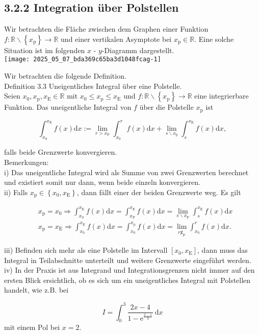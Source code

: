 \documentclass[10pt]{article}
\begin{document}
\subsection*{3.2.2 Integration über Polstellen}
Wir betrachten die Fläche zwischen dem Graphen einer Funktion $f: \mathbb{R} \backslash\left\{x_{\mathrm{p}}\right\} \rightarrow \mathbb{R}$ und einer vertikalen Asymptote bei $x_{\mathrm{p}} \in \mathbb{R}$. Eine solche Situation ist im folgenden $x$ - $y$-Diagramm dargestellt.\\
\texttt{[image: 2025\_05\_07\_bda369c65ba3d1048fcag-1]}

Wir betrachten die folgende Definition.\\
Definition 3.3 Uneigentliches Integral über eine Polstelle.\\
Seien $x_{0}, x_{\mathrm{p}}, x_{\mathrm{E}} \in \mathbb{R}$ mit $x_{0} \leq x_{\mathrm{p}} \leq x_{\mathrm{E}}$ und $f: \mathbb{R} \backslash\left\{x_{\mathrm{p}}\right\} \rightarrow \mathbb{R}$ eine integrierbare Funktion. Das uneigentliche Integral von $f$ über die Polstelle $x_{\mathrm{p}}$ ist


\begin{equation*}
\int_{x_{0}}^{x_{\mathrm{E}}} f(x) \mathrm{d} x:=\lim _{r>x_{\mathrm{P}}} \int_{x_{0}}^{r} f(x) \mathrm{d} x+\lim _{s \backslash x_{\mathrm{p}}} \int_{s}^{x_{\mathrm{E}}} f(x) \mathrm{d} x, \tag{3.40}
\end{equation*}


falls beide Grenzwerte konvergieren.\\
Bemerkungen:\\
i) Das uneigentliche Integral wird als Summe von zwei Grenzwerten berechnet und existiert somit nur dann, wenn beide einzeln konvergieren.\\
ii) Falls $x_{\mathrm{p}} \in\left\{x_{0}, x_{\mathrm{E}}\right\}$, dann fällt einer der beiden Grenzwerte weg. Es gilt


\begin{align*}
& x_{\mathrm{p}}=x_{0} \Rightarrow \int_{x_{0}}^{x_{\mathrm{E}}} f(x) \mathrm{d} x=\int_{x_{\mathrm{P}}}^{x_{\mathrm{E}}} f(x) \mathrm{d} x=\lim _{s \backslash x_{\mathrm{P}}} \int_{s}^{x_{\mathrm{E}}} f(x) \mathrm{d} x  \tag{3.41}\\
& x_{\mathrm{p}}=x_{\mathrm{E}} \Rightarrow \int_{x_{0}}^{x_{\mathrm{E}}} f(x) \mathrm{d} x=\int_{x_{0}}^{x_{\mathrm{p}}} f(x) \mathrm{d} x=\lim _{r \not x_{\mathrm{P}}} \int_{x_{0}}^{r} f(x) \mathrm{d} x . \tag{3.42}
\end{align*}


iii) Befinden sich mehr als eine Polstelle im Intervall $\left[x_{0}, x_{\mathrm{E}}\right]$, dann muss das Integral in Teilabschnitte unterteilt und weitere Grenzwerte eingeführt werden.\\
iv) In der Praxis ist aus Integrand und Integrationsgrenzen nicht immer auf den ersten Blick ersichtlich, ob es sich um ein uneigentliches Integral mit Polstellen handelt, wie z.B. bei


\begin{equation*}
I=\int_{0}^{3} \frac{2 x-4}{1-\mathrm{e}^{\frac{2-x}{3}}} \mathrm{~d} x \tag{3.43}
\end{equation*}
 mit einem Pol bei $x=2$.
\end{document}
